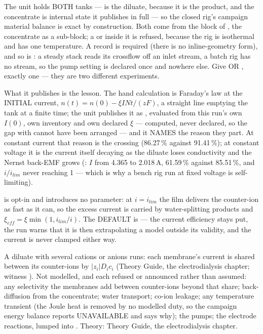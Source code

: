 \documentclass[11pt,a4paper]{article}
\begin{document}
The unit holds BOTH tanks ---  is the diluate, because it is
the product, and the concentrate is internal state it publishes in full ---
so the closed rig's campaign material balance is exact by construction.
Both come from the  block of
, the concentrate as a
 sub-block; a  or  inside it is
refused, because the rig is isothermal and has one temperature.  A
 record is required (there is no inline-geometry form), and so
is : a steady stack reads its crossflow off an inlet
stream, a batch rig has no stream, so the pump setting is declared once and
nowhere else.  Give  OR , exactly one --- they
are two different experiments.

What it publishes is the lesson.  The hand calculation is Faraday's law at
the INITIAL current, $n(t) = n(0) - \xi I N t / (z F)$, a straight line
emptying the tank at a finite time; the unit publishes it as
, evaluated from this run's own $I(0)$, own inventory
and own declared $\xi$ --- computed, never declared, so the gap with
 cannot have been arranged --- and it NAMES the reason
they part.  At constant current that reason is the crossing (86.27\,\%
against 91.41\,\%); at constant voltage it is the current itself decaying
as the diluate loses conductivity and the Nernst back-EMF grows
(: $I$ from 4.365 to 2.018\,A,
61.59\,\% against 85.51\,\%, and $i/i_{lim}$ never reaching 1 --- which is
why a bench rig run at fixed voltage is self-limiting).

 is opt-in and introduces
no parameter: at $i = i_{lim}$ the film delivers the counter-ion as fast as
it can, so the excess current is carried by water-splitting products and
$\xi_{eff} = \xi \min(1, i_{lim}/i)$.  The DEFAULT is  --- the
current efficiency stays put, the run warns that it is then extrapolating a
model outside its validity, and the current is never clamped either way.

A diluate with several cations or anions runs: each membrane's current is
shared between its counter-ions by $|z_i| D_i c_i$ (Theory Guide, the
electrodialysis chapter; witness
).  Not modelled, and each refused or
announced rather than assumed: any selectivity the membranes add between
counter-ions beyond that share; back-diffusion from the concentrate; water transport;
co-ion leakage; any temperature transient (the Joule heat is removed by no
modelled duty, so the campaign energy balance reports UNAVAILABLE and says
why); the pumps; the electrode reactions, lumped into
.  Theory: Theory Guide, the electrodialysis chapter.
\end{document}
